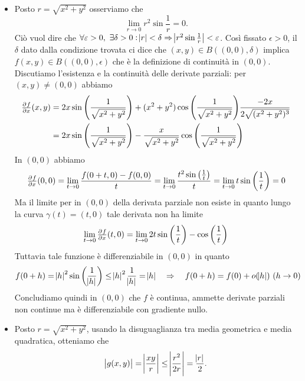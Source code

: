 \begin{itemize}
\item Posto $ r = \sqrt{x^2 + y^2} $ osserviamo che \[\lim_{r \to 0} r^2 \sin{\frac{1}{r}} = 0.\] Ciò vuol dire che $ \forall \epsilon > 0, \ \exists \delta > 0 : \abs{r} < \delta \Rightarrow \abs{r^2 \sin{\frac{1}{r}}} < \epsilon $. Così fissato $ \epsilon > 0 $, il $ \delta $ dato dalla condizione trovata ci dice che $ (x, y) \in B((0, 0), \delta) $ implica $ f(x, y) \in B((0, 0), \epsilon) $ che è la definizione di continuità in $ (0, 0) $. \\
  Discutiamo l'esistenza e la continuità delle derivate parziali: per $ (x, y) \neq (0, 0) $ abbiamo
  \begin{align*}
    \pd{f}{x}(x, y) & = 2x \sin{\left(\frac{1}{\sqrt{x^2 + y^2}}\right)} + (x^2 + y^2) \cos{\left(\frac{1}{\sqrt{x^2 + y^2}}\right)} \frac{- 2x}{2 \sqrt{(x^2 + y^2)^3}} \\
                    & = 2x \sin{\left(\frac{1}{\sqrt{x^2 + y^2}}\right)} - \frac{x}{\sqrt{x^2 + y^2}} \cos{\left(\frac{1}{\sqrt{x^2 + y^2}}\right)}
  \end{align*}
  In $ (0, 0) $ abbiamo
  \begin{equation*}
    \pd{f}{x}(0, 0) = \lim_{t \to 0} \frac{f(0 + t, 0) - f(0, 0)}{t} = \lim_{t \to 0} \frac{t^2 \sin{\left(\frac{1}{t}\right)}}{t} = \lim_{t \to 0} t \sin{\left(\frac{1}{t}\right)} = 0
  \end{equation*}
  Ma il limite per in $ (0, 0) $ della derivata parziale non esiste in quanto lungo la curva $ \gamma(t) = (t, 0) $ tale derivata non ha limite
  \begin{equation*}
    \lim_{t \to 0} \pd{f}{x}(t, 0) = \lim_{t \to 0} 2t \sin{\left(\frac{1}{t}\right)} - \cos{\left(\frac{1}{t}\right)}
  \end{equation*}
  Tuttavia tale funzione è differenziabile in $ (0, 0) $ in quanto
  \begin{equation*}
    f(0 + h) = \abs{h}^2 \sin{\left(\frac{1}{\abs{h}}\right)} \leq \abs{h}^2 \frac{1}{\abs{h}} = \abs{h} \quad \Rightarrow \quad f(0 + h) = f(0) + o(\abs{h}) \ (h \to 0)
  \end{equation*}
  Concludiamo quindi in $ (0, 0) $ che $ f $ è continua, ammette derivate parziali non continue ma è differenziabile con gradiente nullo.
\item Posto $ r = \sqrt{x^2 + y^2} $, usando la disuguaglianza tra media geometrica e media quadratica, otteniamo che
  \begin{equation*}
    \abs{g(x, y)} = \abs{\frac{xy}{r}} \leq \abs{\frac{r^2}{2r}} = \frac{\abs{r}}{2}.

\end{equation*}
\end{itemize}
